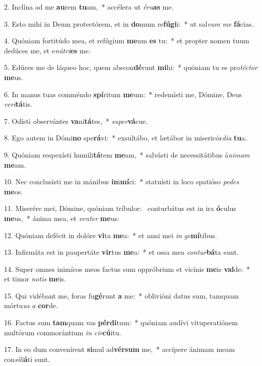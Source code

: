 2. Inclína ad me \textbf{au}rem \textbf{tu}am,~*  accélera ut \textit{é}\textit{ru}\textbf{as} me.\

3. Esto mihi in Deum protectórem, et in \textbf{do}mum re\textbf{fú}\textbf{gi}i:~*  ut sal\textit{vum} \textit{me} \textbf{fá}cias.\

4. Quóniam fortitúdo mea, et refúgium \textbf{me}um \textbf{es} tu:~*  et propter nomen tuum dedúces me, et e\textit{nú}\textit{tri}\textbf{es} me.\

5. Edúces me de láqueo hoc, quem abscon\textbf{dé}runt \textbf{mi}hi:~*  quóniam tu es pro\textit{téc}\textit{tor} \textbf{me}us.\

6. In manus tuas comméndo \textbf{spí}ritum \textbf{me}um:~*  redemísti me, Dómine, Deus \textit{ve}\textit{ri}\textbf{tá}tis.\

7. Odísti observántes \textbf{va}ni\textbf{tá}tes,~*  \textit{su}\textit{per}\textbf{vá}cue.\

8. Ego autem in Dómi\textbf{no} spe\textbf{rá}vi:~*  exsultábo, et lætábor in misericór\textit{di}\textit{a} \textbf{tu}a.\

9. Quóniam respexísti humili\textbf{tá}tem \textbf{me}am,~*  salvásti de necessitátibus á\textit{ni}\textit{mam} \textbf{me}am.\

10. Nec conclusísti me in mánibus \textbf{in}i\textbf{mí}ci:~*  statuísti in loco spatióso \textit{pe}\textit{des} \textbf{me}os.\

11. Miserére mei, Dómine, quóniam tríbulor: \dag\  conturbátus est in ira \textbf{ó}culus \textbf{me}us,~*  ánima mea, et \textit{ven}\textit{ter} \textbf{me}us:\

12. Quóniam defécit in dolóre \textbf{vi}ta \textbf{me}a:~*  et anni mei \textit{in} \textit{ge}\textbf{mí}tibus.\

13. Infirmáta est in paupertáte \textbf{vir}tus \textbf{me}a:~*  et ossa mea \textit{con}\textit{tur}\textbf{bá}ta sunt.\

14. Super omnes inimícos meos factus sum oppróbrium et vicínis \textbf{me}is \textbf{val}de:~*  et timor \textit{no}\textit{tis} \textbf{me}is.\

15. Qui vidébant me, foras fu\textbf{gé}runt \textbf{a} me:~*  oblivióni datus sum, tamquam mórtu\textit{us} \textit{a} \textbf{cor}de.\

16. Factus sum \textbf{tam}quam vas \textbf{pér}\textbf{di}tum:~*  quóniam audívi vituperatiónem multórum commorántium \textit{in} \textit{cir}\textbf{cú}itu.\

17. In eo dum convenírent \textbf{si}mul ad\textbf{vér}\textbf{sum} me,~*  accípere ánimam meam con\textit{si}\textit{li}\textbf{á}ti sunt.\

